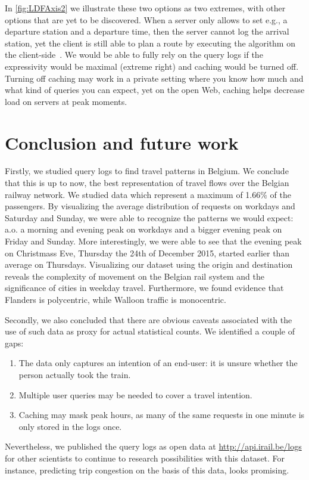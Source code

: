 \documentclass{sig-alternate}
\begin{document}
In \cref{fig:LDFAxis2} we illustrate these two options as two extremes, with other options that are yet to be discovered.
When a server only allows to set e.g., a departure station and a departure time, then the server cannot log the arrival station, yet the client is still able to plan a route by executing the algorithm on the client-side~\cite{lc}.
We would be able to fully rely on the query logs if the expressivity would be maximal (extreme right) and caching would be turned off. 
Turning off caching may work in a private setting where you know how much and what kind of queries you can expect, yet on the open Web, caching helps decrease load on servers at peak moments.



\section{Conclusion and future work}
\label{sec:conclusion}

Firstly, we studied query logs to find travel patterns in Belgium.
We conclude that this is up to now, the best representation of travel flows over the Belgian railway network.%
We studied data which represent a maximum of 1.66\% of the passengers.
By visualizing the average distribution of requests on workdays and Saturday and Sunday, we were able to recognize the patterns we would expect: a.o. a morning and evening peak on workdays and a bigger evening peak on Friday and Sunday.
More interestingly, we were able to see that the evening peak on Christmass Eve, Thursday the 24th of December 2015, started earlier than average on Thursdays.
Visualizing our dataset using the origin and destination reveals the complexity of movement on the Belgian rail system and the significance of cities in weekday travel.
Furthermore, we found evidence that Flanders is polycentric, while Walloon traffic is monocentric.

Secondly, we also concluded that there are obvious caveats associated with the use of such data as proxy for actual statistical counts. 
We identified a couple of gaps:
\begin{enumerate}
  \item The data only captures an intention of an end-user: it is unsure whether the person actually took the train.
  \item Multiple user queries may be needed to cover a travel intention.
  \item Caching may mask peak hours, as many of the same requests in one minute is only stored in the logs once.
\end{enumerate}
Nevertheless, we published the query logs as open data at \url{http://api.irail.be/logs} for other scientists to continue to research possibilities with this dataset.
For instance, predicting trip congestion on the basis of this data, looks promising. %
\end{document}
